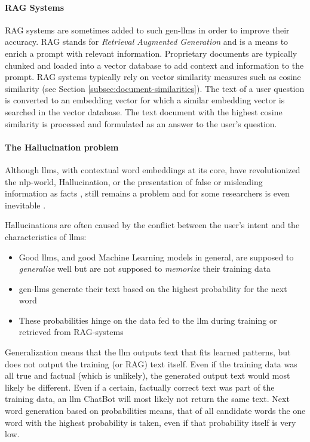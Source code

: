 \paragraph{\gls{RAG} Systems}\label{par:rag-systems}
\gls{RAG} systems are sometimes added to such \glspl{gen-llm} in order to improve their accuracy.
\gls{RAG} stands for \emph{Retrieval Augmented Generation} and is a means to enrich a \gls{prompt} with relevant information.
Proprietary documents are typically chunked and loaded into a vector database to add context and information to the \gls{prompt}.
\gls{RAG} systems typically rely on vector similarity measures such as cosine similarity (see Section \ref{subsec:document-similarities}).
The text of a user question is converted to an embedding vector for which a similar embedding vector is searched in the vector database.
The text document with the highest cosine similarity is processed and formulated as an answer to the user's question.

\paragraph{The Hallucination problem}\label{par:hallucination}
Although \glspl{llm}, with contextual word embeddings at its core, have revolutionized the \gls{nlp}-world,
\gls{Hallucination}, or the presentation of false or misleading information as facts \cite{Hallucination}, still remains a problem and for some researchers is even inevitable \cite{hallucinationinevitable}.


\glspl{Hallucination} are often caused by the conflict between the user's intent and the characteristics of \glspl{llm}:

\begin{itemize}
\item Good \glspl{llm}, and good Machine Learning models in general, are supposed to \emph{generalize} well but are not supposed to \emph{memorize} their training data
\item \glspl{gen-llm} generate their text based on the highest probability for the next word
\item These probabilities hinge on the data fed to the \gls{llm} during training or retrieved from \gls{RAG}-systems
\end{itemize}

Generalization means that the \gls{llm} outputs text that fits learned patterns, but does not output the training (or \gls{RAG}) text itself.
Even if the training data was all true and factual (which is unlikely), the generated output text would most likely be different.
Even if a certain, factually correct text was part of the training data, an \gls{llm} ChatBot will most likely not return the same text.
Next word generation based on probabilities means, that of all candidate words the one word with the highest probability is taken, even if that probability itself is very low.

